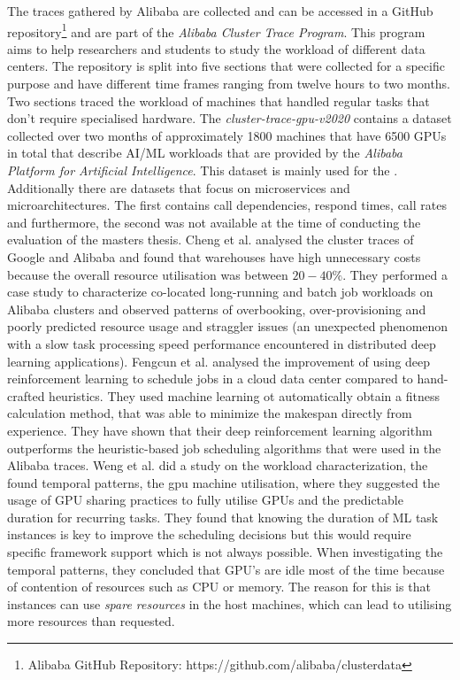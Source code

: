        The traces gathered by Alibaba are collected and can be accessed in a GitHub repository\footnote{Alibaba GitHub Repository: https://github.com/alibaba/clusterdata} and are part of the \emph{Alibaba Cluster Trace Program}. This program aims to help researchers and students to study the workload of different data centers. The repository is split into five sections that were collected for a specific purpose and have different time frames ranging from twelve hours to two months.
        Two sections traced the workload of machines that handled regular tasks that don't require specialised hardware. The \emph{cluster-trace-gpu-v2020} contains a dataset collected over two months of approximately 1800 machines that have 6500 GPUs in total that describe AI/ML workloads that are provided by the \emph{Alibaba Platform for Artificial Intelligence}. This dataset is mainly used for the . 
        Additionally there are datasets that focus on microservices and microarchitectures. The first contains call dependencies, respond times, call rates and furthermore, the second was not available at the time of conducting the evaluation of the masters thesis. Cheng et al. \cite{chengCharacterizingColocatedDatacenter2018} analysed the cluster traces of Google and Alibaba and found that warehouses have high unnecessary costs because the overall resource utilisation was between $20-40\%$. They performed a case study to characterize co-located long-running and batch job workloads on Alibaba clusters and observed patterns of overbooking, over-provisioning and poorly predicted resource usage and straggler issues (an unexpected phenomenon with a slow task processing speed performance encountered in distributed deep learning applications). 
        Fengcun et al. \cite{fengcunDeepJSJobScheduling2023} analysed the improvement of using deep reinforcement learning to schedule jobs in a cloud data center compared to hand-crafted heuristics. They used machine learning ot automatically obtain a fitness calculation method, that was able to minimize the makespan directly from experience. They have shown that their deep reinforcement learning algorithm outperforms the heuristic-based job scheduling algorithms that were used in the Alibaba traces. 
        Weng et al. \cite{wengMLaaSWildWorkload2022} did a study on the workload characterization, the found temporal patterns, the gpu machine utilisation, where they suggested the usage of GPU sharing practices to fully utilise GPUs and the predictable duration for recurring tasks. They found that knowing the duration of ML task instances is key to improve the scheduling decisions but this would require specific framework support which is not always possible. When investigating the temporal patterns, they concluded that GPU's are idle most of the time because of contention of resources such as CPU or memory. The reason for this is that instances can use \emph{spare resources} in the host machines, which can lead to utilising more resources than requested.
         
